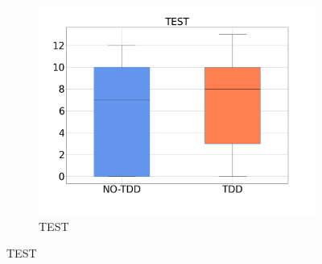 \begin{figure}[H]
\begin{subfigure}{0.33\textwidth}
        \includegraphics[width=\linewidth]{figures/box_plots/task1_2/TEST.png}
        \caption{TEST}
        \label{bp_task1_2_test}
    \end{subfigure}


\end{figure}
